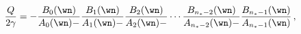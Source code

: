 \begin{equation}
{Q\over 2\gamma} = - 
{B_0(\wn)\over A_0(\wn)-}{B_1(\wn)\over A_1(\wn)-}
{B_2(\wn)\over A_2(\wn)-}\cdots{B_{n_*-2}(\wn)\over A_{n_*-2}(\wn)-}
 {B_{n_*-1}(\wn)\over A_{n_*-1}(\wn)}\,, 
\label{eigen}
\end{equation}


